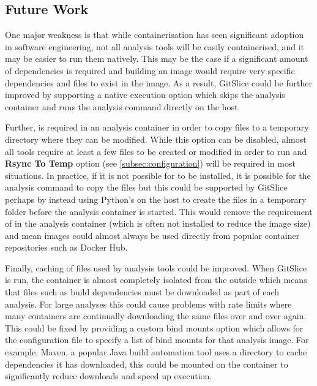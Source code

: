 \subsection{Future Work}
\label{subsec:future-work}

One major weakness is that while containerisation has seen significant adoption in software engineering, not all analysis tools will be easily containerised, and it may be easier to run them natively.
This may be the case if a significant amount of dependencies is required and building an image would require very specific dependencies and files to exist in the image.
As a result, GitSlice could be further improved by supporting a native execution option which skips the analysis container and runs the analysis command directly on the host.

Further,  is required in an analysis container in order to copy files to a temporary directory where they can be modified.
While this option can be disabled, almost all tools require at least a few files to be created or modified in order to run and \textbf{Rsync To Temp} option (see \autoref{subsec:configuration}) will be required in most situations.
In practice, if it is not possible for  to be installed, it is possible for the analysis command to copy the files but this could be supported by GitSlice perhaps by instead using Python's  on the host to create the files in a temporary folder before the analysis container is started.
This would remove the requirement of  in the analysis container (which is often not installed to reduce the image size) and mean images could almost always be used directly from popular container repositories such as Docker Hub.

Finally, caching of files used by analysis tools could be improved.
When GitSlice is run, the container is almost completely isolated from the outside which means that files such as build dependencies must be downloaded as part of each analysis.
For large analyses this could cause problems with rate limits where many containers are continually downloading the same files over and over again.
This could be fixed by providing a custom bind mounts option which allows for the configuration file to specify a list of bind mounts for that analysis image.
For example, Maven, a popular Java build automation tool uses a directory  to cache dependencies it has downloaded, this could be mounted on the container to significantly reduce downloads and speed up execution.
